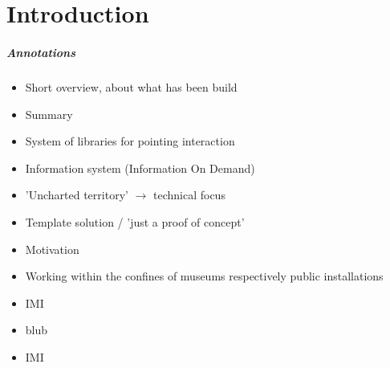 \chapter{Introduction}
\label{introduction}

%
%

\paragraph{Annotations}

\begin{itemize}
	\item Short overview, about what has been build
	\item Summary
	\\
	\item System of libraries for pointing interaction
	\item Information system (Information On Demand)
	\item 'Uncharted territory' $\to$ technical focus
	\item Template solution / 'just a proof of concept'
  \\
	\item Motivation
	\item Working within the confines of museums respectively public installations
	\\
	\item \ac{IMI}
	\item blub
	\item \ac{IMI}
\end{itemize}